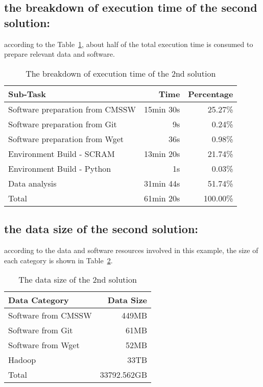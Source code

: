 \documentclass{article}
\begin{document}
\subsection{the breakdown of execution time of the second solution: }
\indent according to the Table~\ref{table:time-2nd}, about half of the total execution time is consumed to prepare relevant data and software.\\


\begin{table}
    \centering
    \begin{tabular}{|l|r|r|}
    \hline
    Sub-Task & Time & Percentage \\ \hline
    Software preparation from CMSSW & 15min 30s & 25.27\% \\ \hline
    Software preparation from Git & 9s & 0.24\% \\ \hline
    Software preparation from Wget & 36s & 0.98\% \\ \hline
    Environment Build - SCRAM & 13min 20s & 21.74\% \\ \hline
    Environment Build - Python & 1s & 0.03\% \\ \hline
    Data analysis & 31min 44s & 51.74\% \\ \hline
    Total & 61min 20s & 100.00\% \\ \hline
    \end{tabular}
    \caption{The breakdown of execution time of the 2nd solution}
    \label{table:time-2nd}
\end{table}




\subsection{the data size of the second solution:}
\indent according to the data and software resources involved in this example, the size of each category is shown in Table~\ref{table:datasize-2nd}.\\

\begin{table}
    \centering
    \begin{tabular}{|l|r|}
    \hline
    Data Category & Data Size \\ \hline
    Software from CMSSW & 449MB \\ \hline
    Software from Git & 61MB \\ \hline
    Software from Wget & 52MB \\ \hline
    Hadoop & 33TB \\ \hline
    Total & 33792.562GB \\ \hline
    \end{tabular}
    \caption{The data size of the 2nd solution}
    \label{table:datasize-2nd}
\end{table}
\end{document}
